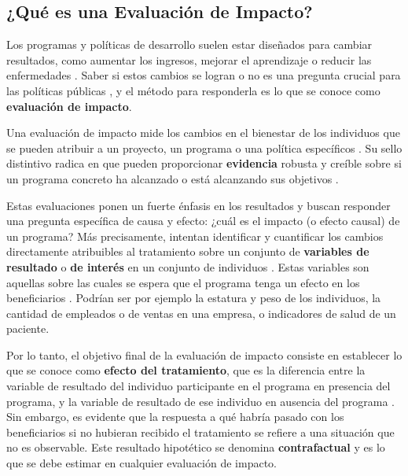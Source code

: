 \documentclass[../../main.tex]{subfiles}
\begin{document}
\subsection{¿Qué es una Evaluación de Impacto?}

Los programas y políticas de desarrollo suelen estar diseñados para cambiar resultados, como aumentar los ingresos, mejorar el aprendizaje o reducir las enfermedades \cite{gertler-2016}. Saber si estos cambios se logran o no es una pregunta crucial para las políticas públicas \cite{gertler-2016}, y el método para responderla es lo que se conoce como \textbf{evaluación de impacto}.

Una evaluación de impacto mide los cambios en el bienestar de los individuos que se pueden atribuir a un proyecto, un programa o una política específicos \cite{gertler-2016}. Su sello distintivo radica en que pueden proporcionar \textbf{evidencia} robusta y creíble sobre si un programa concreto ha alcanzado o está alcanzando sus objetivos \cite{gertler-2016}. 

Estas evaluaciones ponen un fuerte énfasis en los resultados y buscan responder una pregunta específica de causa y efecto: ¿cuál es el impacto (o efecto causal) de un programa? Más precisamente, intentan identificar  y cuantificar los cambios directamente atribuibles al tratamiento \cite{gertler-2016} sobre un conjunto de \textbf{variables de resultado} o \textbf{de interés} en un conjunto de individuos \cite{bernal}. Estas variables son aquellas sobre las cuales se espera que el programa tenga un efecto en los beneficiarios \cite{bernal}. Podrían ser por ejemplo la estatura y peso de los individuos, la cantidad de empleados o de ventas en una empresa, o indicadores de salud de un paciente.

Por lo tanto, el objetivo final de la evaluación de impacto consiste en establecer lo que se conoce como \textbf{efecto del tratamiento}, que es la diferencia entre la variable de resultado del individuo participante en el programa en presencia del programa, y la variable de resultado de ese individuo en ausencia del programa \cite{bernal}. Sin embargo, es evidente que la respuesta a qué habría pasado con los beneficiarios si no hubieran recibido el tratamiento se refiere a una situación que no es observable. Este resultado hipotético se denomina \textbf{contrafactual} y es lo que se debe estimar en cualquier evaluación de impacto.
\end{document}
